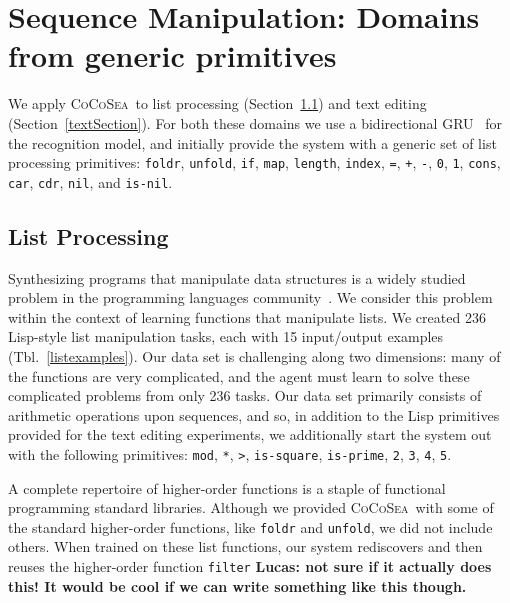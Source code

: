 \documentclass{article}
\newcommand{\system}{\textsc{CoCoSea}~}
\newcommand{\code}[1]{{\footnotesize\texttt{#1}}}
\begin{document}
\section{Sequence Manipulation: Domains from generic primitives}\label{sequences}
We apply \system to list processing (Section~\ref{listSection}) and text editing (Section~\ref{textSection}).
For both these domains we use a bidirectional GRU~\cite{cho2014learning} for
the recognition model, and initially provide the system with a generic set
of list processing primitives:
\code{foldr}, \code{unfold}, \code{if}, \code{map}, \code{length},
\code{index}, \code{=}, \code{+}, \code{-}, \code{0}, \code{1}, \code{cons},
\code{car}, \code{cdr}, \code{nil}, and \code{is-nil}.



\subsection{List Processing}\label{listSection}
Synthesizing programs that manipulate data structures is a widely studied
problem in the programming languages community~\cite{feser2015synthesizing}.
We consider this problem within the context of learning functions that
manipulate lists.
We created 236 Lisp-style list manipulation tasks, each with 15 input/output
examples (Tbl.~\ref{listexamples}).
Our data set is challenging along two dimensions: many of the functions are
very complicated, and the agent must learn to solve these complicated
problems from only 236 tasks.
Our data set primarily consists of arithmetic operations upon sequences, and
so, in addition to the Lisp primitives provided for the text editing
experiments, we additionally start the system out with the following
primitives:
\code{mod}, \code{*}, \code{>}, \code{is-square}, \code{is-prime}, \code{2},
\code{3}, \code{4}, \code{5}.

A complete repertoire of higher-order functions is a staple of functional
programming standard libraries.
Although we provided \system with some of the standard higher-order
functions, like \code{foldr} and \code{unfold}, we did not include others.
When trained on these list functions, our system rediscovers and then reuses
the higher-order function \code{filter} \textbf{Lucas: not sure if it
actually does this! It would be cool if we can write something like this
though.}


\end{document}
